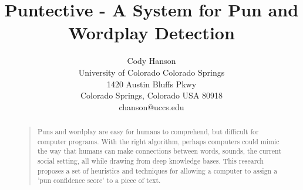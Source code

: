 \documentclass[letterpaper]{article}
\begin{document}
\title{Puntective - A System for Pun and Wordplay Detection}
\author{Cody Hanson\\
University of Colorado Colorado Springs\\
1420 Austin Bluffs Pkwy\\
Colorado Springs, Colorado USA 80918\\
chanson@uccs.edu}
\maketitle
\begin{abstract}
\begin{quote}
Puns and wordplay are easy for humans to comprehend, but difficult for computer programs.
With the right algorithm, perhaps computers could mimic the way that humans can make connections between words, sounds, the current social setting, all while drawing from deep knowledge bases. 
This research proposes a set of heuristics and techniques for allowing a computer to assign a 'pun confidence score' to a piece of text.
\end{quote}
\end{abstract}







 

\end{document}
